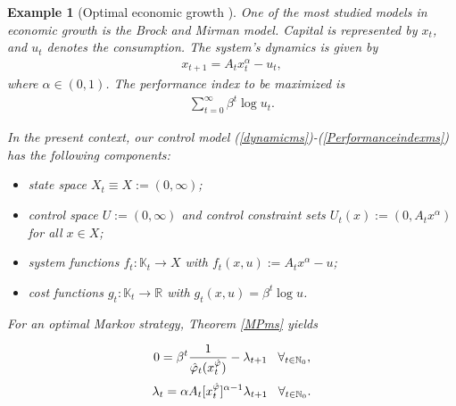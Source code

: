 \documentclass[3p]{elsarticle}
\newcommand{\rz}{\mathbb R}
\newcommand{\nat}{\mathbb N_0}
\newtheorem{examp}[thm]{Example}
\begin{document}
	
	
	
	
	
	
	
	
	
	
	
	
	
	
	
	
	
	
	
	\begin{examp}[Optimal economic growth \cite{EconomicGrowth,Ljungq}]
		One of the most studied models in economic growth is the Brock and Mirman model. Capital is represented by $x_t$, and $u_t$ denotes the consumption. The system's dynamics is given by
		\begin{align*}
		x_{t+1}=A_tx_t^\alpha-u_t,
		\end{align*}
		where $\alpha\in(0,1)$. The performance index to be maximized is 
		\begin{align*}
		\sum_{t=0}^\infty\beta^t\log u_t.
		\end{align*}
		
		In the present context, our control model (\ref{dynamicms})-(\ref{Performanceindexms}) has the following components:
		
		\begin{itemize}
			\item state space $X_t\equiv X:=(0,\infty)$;
			\item control space $U:=(0,\infty)$ and control constraint sets $U_t(x):=(0,A_tx^\alpha)$ for all $x\in X$;
			\item system functions $f_t:\mathbb K_t\to X$ with $f_t(x,u):=A_tx^\alpha-u$;
			\item cost functions $g_t:\mathbb K_t\to \rz$ with $g_t(x,u)=\beta^t\log u $.
		\end{itemize}
		
		 For an optimal Markov strategy, Theorem \ref{MPms} yields
		
		
		
		\begin{align}\label{abmm}
		0=\beta^t \frac{1}{\hat\varphi_t(x_t^{\hat\varphi})}-\lambda_{t+1}\hspace{0.3cm}\forall_{t\in\nat},
		\end{align} 
		\begin{align}\label{bbmm}
		\lambda_t=\alpha A_t[x_t^{\hat\varphi}]^{\alpha-1}\lambda_{t+1}\hspace{0.3cm}\forall_{t\in\nat}.
		\end{align}
		

\end{examp}
\end{document}
